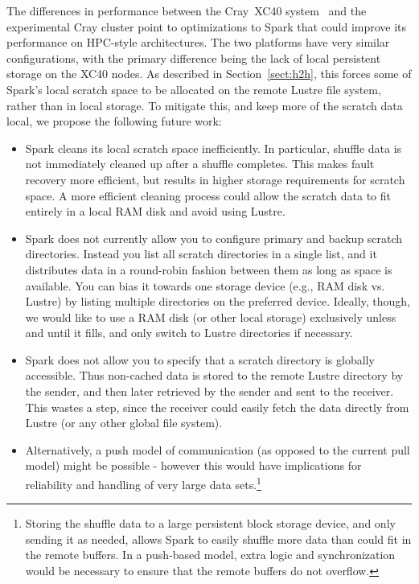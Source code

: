 The differences in performance between the Cray{\textsuperscript{\tiny\textregistered}}~XC40{\textsuperscript{\tiny\texttrademark}} system~\cite{alverson2012cray,craycascadesc12} and the experimental Cray cluster point to optimizations to Spark that could improve its performance on HPC-style architectures.  The two platforms have very similar configurations, with the primary difference being the lack of local persistent storage on the XC40 nodes.  As described in Section~\ref{sect:h2h}, this forces some of Spark's local scratch space to be allocated on the remote Lustre file system, rather than in local storage.  To mitigate this, and keep more of the scratch data local, we propose the following future work:
\begin{itemize}
  \item Spark cleans its local scratch space inefficiently.
  In particular, shuffle data is not immediately cleaned up after a shuffle
  completes. This makes fault recovery more efficient, but results in higher
  storage requirements for scratch space. A more efficient cleaning process could
  allow the scratch data to fit entirely in a local RAM disk and
  avoid using Lustre.
\item Spark does not currently allow you to configure primary and backup
  scratch directories.  Instead you list all scratch directories in a single
  list, and it distributes data in a round-robin fashion between them as long
  as space is available.  You can bias it towards one storage device (e.g., RAM
  disk vs. Lustre) by listing multiple directories on the preferred device.
  Ideally, though, we would like to use a RAM disk (or other local storage)
  exclusively unless and until it fills, and only switch to Lustre directories
  if necessary.
\item Spark does not allow you to specify that a scratch directory is globally
  accessible.  Thus non-cached data is stored to the remote Lustre directory by
  the sender, and then later retrieved by the sender and sent to the receiver.
  This wastes a step, since the receiver could easily fetch the data directly
  from Lustre (or any other global file system).
\item Alternatively, a push model of communication (as opposed to the current
  pull model) might be possible - however this would have implications for
  reliability and handling of very large data sets.\footnote{Storing the
    shuffle data to a large persistent block storage device, and only sending
    it as needed, allows Spark to easily shuffle more data than could fit in
    the remote buffers.  In a push-based model, extra logic and synchronization
    would be necessary to ensure that the remote buffers do not overflow.}
\end{itemize}
